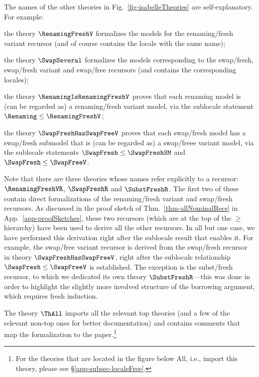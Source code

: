 The names of the  other theories in Fig.~\ref{fig-isabelleTheories} are 
self-explanatory. For example:
\begin{mmyitem}
\item the theory $\RenamingFreshV$ formalizes the models for the renaming/fresh variant recursor (and of course contains the locale with the same name);
%
\item the theory $\SwapSeveral$ formalizes the models corresponding to the swap/fresh, swap/fresh variant and swap/free recursors (and contains the corresponding locales); 
%
\item the theory $\RenamingIsRenamingFreshV$ proves that each renaming model is (can be regarded as) a renaming/fresh variant model, via the sublocale statement $\Renaming \leq \RenamingFreshV$; 
%
\item the theory $\SwapFreshHasSwapFreeV$ proves that each swap/fresh model has a swap/fresh submodel that is (can be regarded as) a swap/freee variant model, via the sublocale statements 
$\SwapFresh \leq \SwapFreshSM$ and $\SwapFresh \leq \SwapFreeV$. 
\end{mmyitem}

Note that there are three theories whose names refer explicitly to a recursor: $\RenamingFreshVR$, $\SwapFreshR$ and 
$\SubstFreshR$. The first two of these contain direct formalizations of the renaming/fresh variant and swap/fresh recursors. As discussed in the proof sketch of Thm.~\ref{thm-allNominalRecs}
in App.~\ref{app-proofSketches}, these two recursors (which are at the top of the $\geq$ hierarchy) have been used to derive all the other recursors. In all but one case, we have performed this derivation right after the sublocale result that enables it. For example, the swap/free variant recursor is derived from the swap/fresh recursor in theory  $\SwapFreshHasSwapFreeV$, right after the sublocale relationship $\SwapFresh \leq \SwapFreeV$ is established. 
The exception is the subst/fresh recursor, to which we dedicated its own theory $\SubstFreshR$---this was done in order to highlight the slightly more involved structure of the borrowing argument, which requires fresh induction. 

The theory $\ThAll$ imports all the relevant top theories (and a few of the relevant non-top ones for better documentation) and contains comments that map the formalization to the paper.\footnote{For the theories that are located in the figure below \textsf{All}, i.e., import  this theory, please see \S\ref{app-subsec-localeFree}.}



